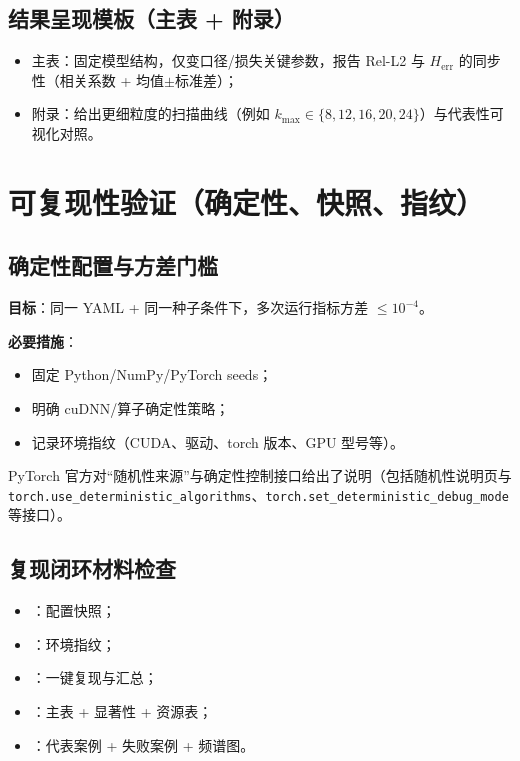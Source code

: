 \subsection{结果呈现模板（主表 + 附录）}
\begin{itemize}
  \item 主表：固定模型结构，仅变口径/损失关键参数，报告 Rel-L2 与 $H_{\mathrm{err}}$ 的同步性（相关系数 + 均值$\pm$标准差）；
  \item 附录：给出更细粒度的扫描曲线（例如 $k_{\max}\in\{8,12,16,20,24\}$）与代表性可视化对照。
\end{itemize}

\section{可复现性验证（确定性、快照、指纹）}

\subsection{确定性配置与方差门槛}
\textbf{目标}：同一 YAML + 同一种子条件下，多次运行指标方差 $\le 10^{-4}$。

\textbf{必要措施}：
\begin{itemize}
  \item 固定 Python/NumPy/PyTorch seeds；
  \item 明确 cuDNN/算子确定性策略；
  \item 记录环境指纹（CUDA、驱动、torch 版本、GPU 型号等）。
\end{itemize}

PyTorch 官方对“随机性来源”与确定性控制接口给出了说明（包括随机性说明页与 \texttt{torch.use\_deterministic\_algorithms}、\texttt{torch.set\_deterministic\_debug\_mode} 等接口）\cite{pytorch_randomness,pytorch_use_deterministic,pytorch_set_det_debug}。

\subsection{复现闭环材料检查}
\begin{itemize}
  \item {}：配置快照；
  \item {}：环境指纹；
  \item {}：一键复现与汇总；
  \item {}：主表 + 显著性 + 资源表；
  \item {}：代表案例 + 失败案例 + 频谱图。
\end{itemize}

